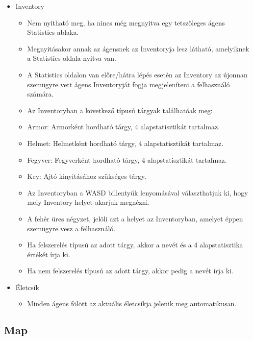 \begin{itemize}
    \item Inventory
    
    \begin{itemize}
        \item Nem nyitható meg, ha nincs még megnyitva egy tetszőleges ágens Statistics ablaka.
        \item Megnyitásakor annak az ágensnek az Inventoryja lesz látható, amelyiknek a Statistics oldala nyitva van.
        \item A Statistics oldalon van előre/hátra lépés esetén az Inventory az újonnan szemügyre vett ágens Inventoryját fogja megjeleníteni a felhasználó számára.
        \item Az Inventoryban a következő típusú tárgyak találhatóak meg:
        \item Armor: Armorként hordható tárgy, 4 alapstatisztikát tartalmaz.
        \item Helmet: Helmetként hordható tárgy, 4 alapstatisztikát tartalmaz.
        \item Fegyver: Fegyverként hordható tárgy, 4 alapstatisztikát tartalmaz.
        \item Key: Ajtó kinyitásához szükséges tárgy.
        \item Az Inventoryban a WASD billentyűk lenyomásával választhatjuk ki, hogy mely Inventory helyet akarjuk megnézni.
        \item A fehér üres négyzet, jelöli azt a helyet az Inventoryban, amelyet éppen szemügyre vesz a felhasználó.
        \item Ha felszerelés típusú az adott tárgy, akkor a nevét és a 4 alapstatisztika értékét írja ki.
        \item Ha nem felszerelés típusú az adott tárgy, akkor pedig a nevét írja ki.
    \end{itemize}

    \item Életcsík
    
    \begin{itemize}
        \item Minden ágens fölött az aktuális életcsíkja jelenik meg automatikusan.
    \end{itemize}


\end{itemize}


\subsection{Map}

